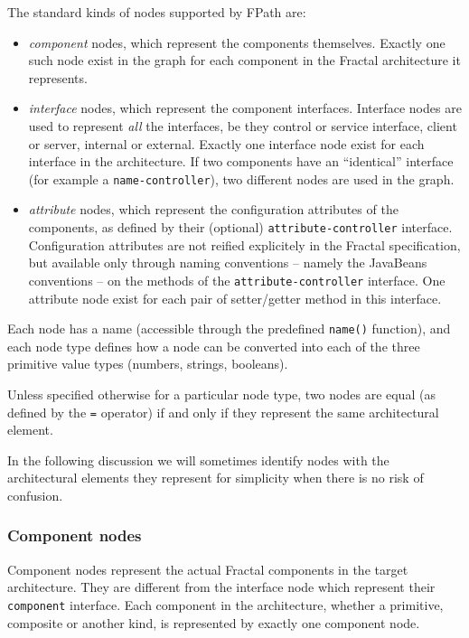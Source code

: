\documentclass[a4paper,12pt]{report}
\begin{document}
The standard kinds of nodes supported by FPath are:
\begin{itemize}
\item \emph{component} nodes, which represent the components themselves. Exactly one such
  node exist in the graph for each component in the Fractal architecture it represents.
\item \emph{interface} nodes, which represent the component interfaces. Interface nodes
  are used to represent \emph{all} the interfaces, be they control or service interface,
  client or server, internal or external. Exactly one interface node exist for each
  interface in the architecture. If two components have an ``identical'' interface (for
  example a \texttt{name-controller}), two different nodes are used in the graph.
\item \emph{attribute} nodes, which represent the configuration attributes of the
  components, as defined by their (optional) \texttt{attribute-controller} interface.
  Configuration attributes are not reified explicitely in the Fractal specification, but
  available only through naming conventions -- namely the JavaBeans conventions -- on the
  methods of the \texttt{attribute-controller} interface. One attribute node exist for
  each pair of setter/getter method in this interface.
\end{itemize}

Each node has a name (accessible through the predefined \texttt{name()} function), and
each node type defines how a node can be converted into each of the three primitive value
types (numbers, strings, booleans).

Unless specified otherwise for a particular node type, two nodes are equal (as defined by
the \texttt{=} operator) if and only if they represent the same architectural element.

In the following discussion we will sometimes identify nodes with the architectural
elements they represent for simplicity when there is no risk of confusion.

\subsubsection{Component nodes}
\label{sec:component-nodes}

Component nodes represent the actual Fractal components in the target architecture. They
are different from the interface node which represent their \texttt{component} interface.
Each component in the architecture, whether a primitive, composite or another kind, is
represented by exactly one component node.
\end{document}
